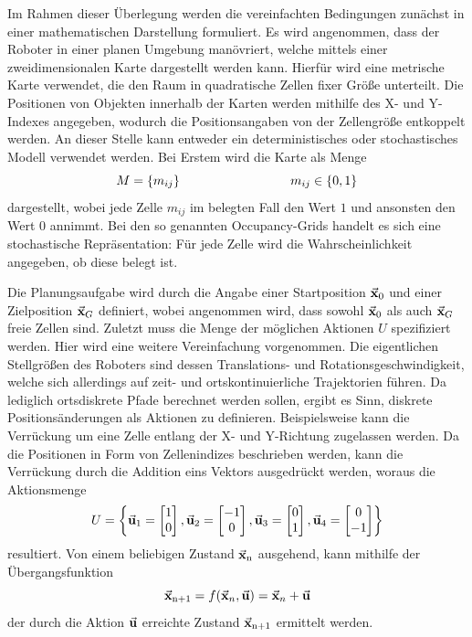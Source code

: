Im Rahmen dieser Überlegung werden die vereinfachten Bedingungen zunächst in einer mathematischen Darstellung formuliert. Es wird angenommen, dass der Roboter in einer planen Umgebung manövriert, welche mittels einer zweidimensionalen Karte dargestellt werden kann. Hierfür wird eine metrische Karte verwendet, die den Raum in quadratische Zellen fixer Größe unterteilt. Die Positionen von Objekten innerhalb der Karten werden mithilfe des X- und Y-Indexes angegeben, wodurch die Positionsangaben von der Zellengröße entkoppelt werden. An dieser Stelle kann entweder ein deterministisches oder stochastisches Modell verwendet werden. Bei Erstem wird die Karte als Menge
\begin{equation}
M = \left\{m_{ij}\right\} \hspace{3.cm} m_{ij} \in \left\{0, 1\right\}
\end{equation}
dargestellt, wobei jede Zelle $m_{ij}$ im belegten Fall den Wert $1$ und ansonsten den Wert $0$ annimmt. Bei den so genannten Occupancy-Grids handelt es sich eine stochastische Repräsentation: Für jede Zelle wird die Wahrscheinlichkeit angegeben, ob diese belegt ist. 

Die Planungsaufgabe wird durch die Angabe einer Startposition $\vec{\mathbf{x}}_0$ und einer Zielposition $\vec{\mathbf{x}}_G$ definiert, wobei angenommen wird, dass sowohl $\vec{\mathbf{x}}_0$ als auch $\vec{\mathbf{x}}_G$ freie Zellen sind.
Zuletzt muss die Menge der möglichen Aktionen $U$ spezifiziert werden. Hier wird eine weitere Vereinfachung vorgenommen. Die eigentlichen Stellgrößen des Roboters sind dessen Translations- und Rotationsgeschwindigkeit, welche sich allerdings auf zeit- und ortskontinuierliche Trajektorien führen. Da lediglich ortsdiskrete Pfade berechnet werden sollen, ergibt es Sinn, diskrete Positionsänderungen als Aktionen zu definieren. Beispielsweise kann die Verrückung um eine Zelle entlang der X- und Y-Richtung zugelassen werden. Da die Positionen in Form von Zellenindizes beschrieben werden, kann die Verrückung durch die Addition eins Vektors ausgedrückt werden, woraus die Aktionsmenge
\begin{equation}\label{eq_Uset}
U = \left\{ 
\vec{\mathbf{u}}_{\text{1}} = \begin{bmatrix} 1 \\ 0 \end{bmatrix}, 
\vec{\mathbf{u}}_{\text{2}} = \begin{bmatrix} -1 \\ 0 \end{bmatrix},
\vec{\mathbf{u}}_{\text{3}} = \begin{bmatrix} 0 \\ 1 \end{bmatrix},
\vec{\mathbf{u}}_{\text{4}} = \begin{bmatrix} 0 \\ -1\end{bmatrix} \right\}
\end{equation}
resultiert. Von einem beliebigen Zustand $\vec{\mathbf{x}}_{\text{n}}$ ausgehend, kann mithilfe der Übergangsfunktion
\begin{equation}\label{eq_fxnew}
\vec{\mathbf{x}}_{\text{n+1}} = f(\vec{\mathbf{x}}_n, \vec{\mathbf{u}}) = \vec{\mathbf{x}}_n + \vec{\mathbf{u}}
\end{equation}
der durch die Aktion $\vec{\mathbf{u}}$ erreichte Zustand $\vec{\mathbf{x}}_{\text{n+1}}$ ermittelt werden.

